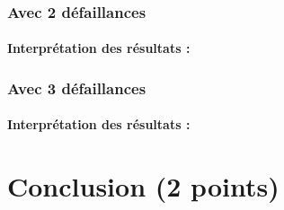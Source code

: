 \documentclass[a4paper]{book}
\begin{document}
\subsubsection{Avec 2 défaillances}

\paragraph{Interprétation des résultats :}


\subsubsection{Avec 3 défaillances}

\paragraph{Interprétation des résultats :}

\section{Conclusion (2 points)}
\end{document}
